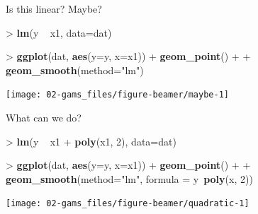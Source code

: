 \documentclass[10pt,ignorenonframetext,compress, aspectratio=169]{beamer}
\newenvironment{Shaded}{\begin{snugshade}}{\end{snugshade}}
\newcommand{\KeywordTok}[1]{\textcolor[rgb]{0.13,0.29,0.53}{\textbf{{#1}}}}
\newcommand{\DataTypeTok}[1]{\textcolor[rgb]{0.13,0.29,0.53}{{#1}}}
\newcommand{\DecValTok}[1]{\textcolor[rgb]{0.00,0.00,0.81}{{#1}}}
\newcommand{\StringTok}[1]{\textcolor[rgb]{0.31,0.60,0.02}{{#1}}}
\newcommand{\NormalTok}[1]{{#1}}
\begin{document}
\begin{frame}[fragile]{Is this linear? Maybe?}

\begin{Shaded}
\begin{Highlighting}[]
\NormalTok{>}\StringTok{ }\KeywordTok{lm}\NormalTok{(y ~}\StringTok{ }\NormalTok{x1, }\DataTypeTok{data=}\NormalTok{dat)}
\end{Highlighting}
\end{Shaded}

\begin{Shaded}
\begin{Highlighting}[]
\NormalTok{>}\StringTok{ }\KeywordTok{ggplot}\NormalTok{(dat, }\KeywordTok{aes}\NormalTok{(}\DataTypeTok{y=}\NormalTok{y, }\DataTypeTok{x=}\NormalTok{x1)) +}\StringTok{ }\KeywordTok{geom_point}\NormalTok{() +}
\NormalTok{+}\StringTok{     }\KeywordTok{geom_smooth}\NormalTok{(}\DataTypeTok{method=}\StringTok{"lm"}\NormalTok{)}
\end{Highlighting}
\end{Shaded}

\begin{center}\texttt{[image: 02-gams\_files/figure-beamer/maybe-1]} \end{center}

\end{frame}

\begin{frame}[fragile]{What can we do?}

\begin{Shaded}
\begin{Highlighting}[]
\NormalTok{>}\StringTok{ }\KeywordTok{lm}\NormalTok{(y ~}\StringTok{ }\NormalTok{x1 +}\StringTok{ }\KeywordTok{poly}\NormalTok{(x1, }\DecValTok{2}\NormalTok{), }\DataTypeTok{data=}\NormalTok{dat)}
\end{Highlighting}
\end{Shaded}

\begin{Shaded}
\begin{Highlighting}[]
\NormalTok{>}\StringTok{ }\KeywordTok{ggplot}\NormalTok{(dat, }\KeywordTok{aes}\NormalTok{(}\DataTypeTok{y=}\NormalTok{y, }\DataTypeTok{x=}\NormalTok{x1)) +}\StringTok{ }\KeywordTok{geom_point}\NormalTok{() +}
\NormalTok{+}\StringTok{     }\KeywordTok{geom_smooth}\NormalTok{(}\DataTypeTok{method=}\StringTok{"lm"}\NormalTok{, }\DataTypeTok{formula =} \NormalTok{y~}\KeywordTok{poly}\NormalTok{(x, }\DecValTok{2}\NormalTok{))}
\end{Highlighting}
\end{Shaded}

\begin{center}\texttt{[image: 02-gams\_files/figure-beamer/quadratic-1]} \end{center}

\end{frame}
\end{document}
